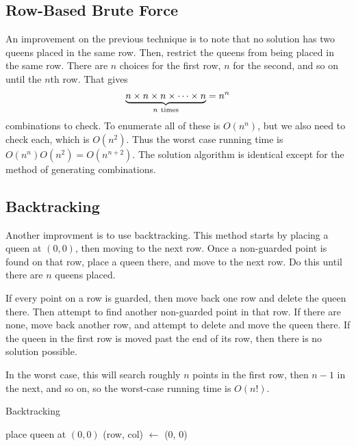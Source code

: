 \documentclass{article}
\begin{document}
\subsection*{Row-Based Brute Force}
\label{sub:row_based_brute_force}

An improvement on the previous technique is to note that no solution has two
queens placed in the same row. Then, restrict the queens from being placed in
the same row. There are $n$ choices for the first row, $n$ for the second, and
so on until the $n$th row. That gives $$\underbrace{n \times n \times n \times
\cdots \times n}_{n \ \rm times} = n^n$$ combinations to check. To enumerate all
of these is $O(n^n)$, but we also need to check each, which is $O(n^2)$. Thus the
worst case running time is $O(n^n)O(n^2) = O(n^{n+2})$. The solution algorithm is
identical except for the method of generating combinations.

\subsection*{Backtracking}
\label{sub:backtracking}

Another improvment is to use backtracking. This method starts by placing a queen
at $(0, 0)$, then moving to the next row. Once a non-guarded point is found on
that row, place a queen there, and move to the next row. Do this until there are
$n$ queens placed.

If every point on a row is guarded, then move back one row and delete the queen
there. Then attempt to find another non-guarded point in that row. If there are
none, move back another row, and attempt to delete and move the queen there. If
the queen in the first row is moved past the end of its row, then there is no
solution possible.

In the worst case, this will search roughly $n$ points in the first row, then
$n - 1$ in the next, and so on, so the worst-case running time is $O(n!)$.

\begin{algorithm}[H]
    \caption{Backtracking}

    place queen at $(0, 0)$\;
    (row, col) $\leftarrow$ (0, 0)\;

\end{algorithm}
\end{document}
